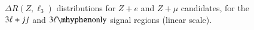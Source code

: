 \begin{figure}
{  }
  \caption{$\Delta R(Z,\ell_3)$ distributions for $Z+e$ and $Z+\mu$ candidates, for the $3\ell+jj$ and $\threelo$ signal regions (linear scale).}
  \label{fig:SR-dR-2-linear}
\end{figure}


